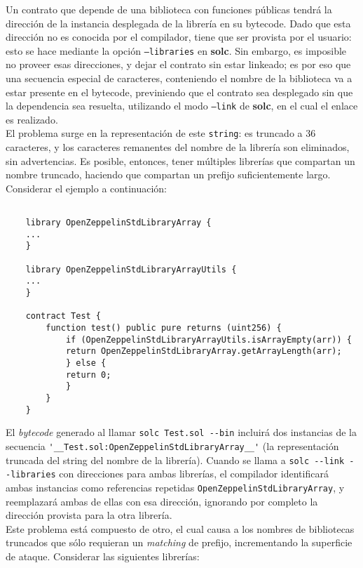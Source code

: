 Un contrato que depende de una biblioteca con funciones públicas tendrá la dirección de la instancia desplegada de la librería en su bytecode. Dado que esta dirección no es conocida por el compilador, tiene que ser provista por el usuario: esto se hace mediante la opción \texttt{--libraries} en \textbf{solc}. Sin embargo, es imposible no proveer esas direcciones, y dejar el contrato sin estar linkeado; es por eso que una secuencia especial de caracteres, conteniendo el nombre de la biblioteca va a estar presente en el bytecode, previniendo que el contrato sea desplegado sin que la dependencia sea resuelta, utilizando el modo \texttt{--link} de \textbf{solc}, en el cual el enlace es realizado.\\

El problema surge en la representación de este \texttt{string}: es truncado a 36 caracteres, y los caracteres remanentes del nombre de la librería son eliminados, sin advertencias. Es posible, entonces, tener múltiples librerías que compartan un nombre truncado, haciendo que compartan un prefijo suficientemente largo. Considerar el ejemplo a continuación:


\begin{lstlisting}[language=Solidity]
    
    library OpenZeppelinStdLibraryArray {
    ...
    }

    library OpenZeppelinStdLibraryArrayUtils {
    ...
    }

    contract Test {
        function test() public pure returns (uint256) {
            if (OpenZeppelinStdLibraryArrayUtils.isArrayEmpty(arr)) {
            return OpenZeppelinStdLibraryArray.getArrayLength(arr);
            } else {
            return 0;
            }   
        }
    }
\end{lstlisting}

El \textit{bytecode} generado al llamar \verb|solc Test.sol --bin| incluirá dos instancias de la secuencia \verb|'__Test.sol:OpenZeppelinStdLibraryArray__'| (la representación truncada del string del nombre de la librería). Cuando se llama a \verb|solc --link --libraries| con direcciones para ambas librerías, el compilador identificará ambas instancias como referencias repetidas \verb|OpenZeppelinStdLibraryArray|, y reemplazará ambas de ellas con esa dirección, ignorando por completo la dirección provista para la otra librería.\\

Este problema está compuesto de otro, el cual causa a los nombres de bibliotecas truncados que sólo requieran un \textit{matching} de prefijo, incrementando la superficie de ataque. Considerar las siguientes librerías:

